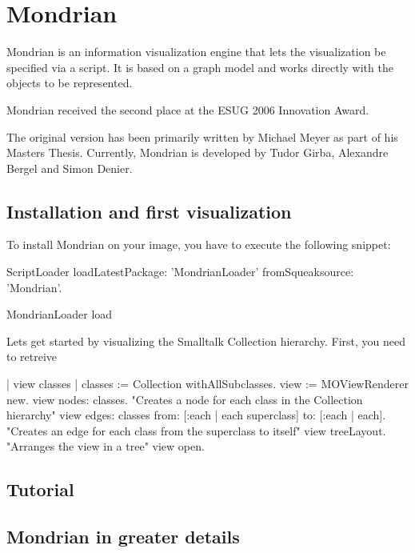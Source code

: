 \documentclass[a4paper,10pt,twoside]{book}
\begin{document}
\fi
\sloppy
\chapter{Mondrian}


Mondrian is an information visualization engine that lets the
visualization be specified via a script.  It is based on a graph model
and works directly with the objects to be represented.

Mondrian received the second place at the ESUG 2006 Innovation Award.

The original version has been primarily written by Michael Meyer as
part of his Masters Thesis. Currently, Mondrian is developed by Tudor
Girba, Alexandre Bergel and Simon Denier.

\section{Installation and first visualization}

To install Mondrian on your image, you have to execute the following
snippet:

\begin{code}{}
ScriptLoader loadLatestPackage: 'MondrianLoader' fromSqueaksource: 'Mondrian'.

MondrianLoader load
\end{code}

Lets get started by visualizing the Smalltalk Collection
hierarchy. First, you need to retreive

\begin{code}{}
| view classes |
classes := Collection withAllSubclasses.
view := MOViewRenderer new.
view nodes: classes.                  "Creates a node for each class in the Collection hierarchy"
view edges: classes            
     from: [:each | each superclass] 
     to: [:each | each].              "Creates an edge for each class from the superclass to itself"
view treeLayout.                      "Arranges the view in a tree"
view open.
\end{code}

\section{Tutorial}

\section{Mondrian in greater details}



\ifx\wholebook\relax\else
   
   
\end{document}
